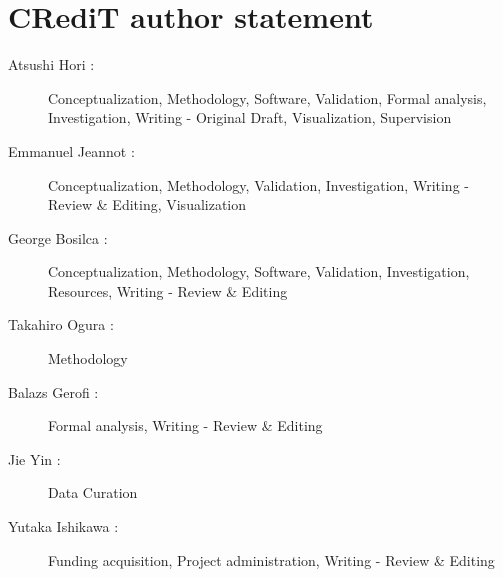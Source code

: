 \documentclass[]{article}
\begin{document}
\section*{CRediT author statement}

\begin{description}

\item[Atsushi Hori :]
  Conceptualization, Methodology, Software, Validation, Formal
  analysis, Investigation, Writing - Original Draft, Visualization,
  Supervision 
  
\item[Emmanuel Jeannot :]
  Conceptualization, Methodology, Validation, Investigation, Writing -
  Review \& Editing, Visualization
  
\item[George Bosilca :]
  Conceptualization, Methodology, Software, Validation, Investigation,
  Resources, Writing - Review \& Editing

\item[Takahiro Ogura :]
  Methodology
  
\item[Balazs Gerofi :]
  Formal analysis, Writing - Review \& Editing
  
\item[Jie Yin :]
  Data Curation
  
\item[Yutaka Ishikawa :]
  Funding acquisition, Project administration, Writing - Review \& Editing

\end{description}
  
\end{document}
